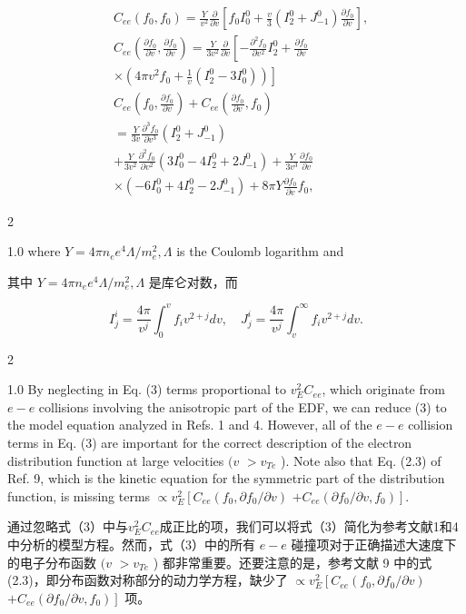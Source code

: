 \documentclass[oneside,onecolumn]{article}
\newcommand\enzhbox[2]{
  	\quad\par \begin{paracol}{2} \colseprulecolor{black} 
  			\begin{spacing}{1.0}
  				\footnotesize  #1
  			\end{spacing}
  		\switchcolumn[1] 
  		#2
  	\end{paracol} 
  }
\begin{document}
\begin{sloppypar}
  \begin{dmath}[compact]
  \begin{aligned}
  & C_{e e}\left(f_{0}, f_{0}\right)=\frac{Y}{v^{2}} \frac{\partial}{\partial v}\left[f_{0} I_{0}^{0}+\frac{v}{3}\left(I_{2}^{0}+J_{-1}^{0}\right) \frac{\partial f_{0}}{\partial v}\right], \\
  & C_{e e}\left(\frac{\partial f_{0}}{\partial v}, \frac{\partial f_{0}}{\partial v}\right)=\frac{Y}{3 v^{2}} \frac{\partial}{\partial v}\left[-\frac{\partial^{2} f_{0}}{\partial v^{2}} I_{2}^{0}+\frac{\partial f_{0}}{\partial v}\right. \\
  & \left.\times\left(4 \pi v^{2} f_{0}+\frac{1}{v}\left(I_{2}^{0}-3 I_{0}^{0}\right)\right)\right] \\
  & C_{e e}\left(f_{0}, \frac{\partial f_{0}}{\partial v}\right)+C_{e e}\left(\frac{\partial f_{0}}{\partial v}, f_{0}\right) \\
  & =\frac{Y}{3 v} \frac{\partial^{3} f_{0}}{\partial v^{3}}\left(I_{2}^{0}+J_{-1}^{0}\right) \\
  & +\frac{Y}{3 v^{2}} \frac{\partial^{2} f_{0}}{\partial v^{2}}\left(3 I_{0}^{0}-4 I_{2}^{0}+2 J_{-1}^{0}\right)+\frac{Y}{3 v^{3}} \frac{\partial f_{0}}{\partial v} \\
  & \times\left(-6 I_{0}^{0}+4 I_{2}^{0}-2 J_{-1}^{0}\right)+8 \pi Y \frac{\partial f_{0}}{\partial v} f_{0},
  \end{aligned}
  \end{dmath}
  
 
\enzhbox{   where $Y=4 \pi n_{e} e^{4} \Lambda / m_{e}^{2}, \Lambda$ is the Coulomb logarithm and
}{
其中 $Y=4 \pi n_{e} e^{4} \Lambda / m_{e}^{2}, \Lambda$ 是库仑对数，而

}
  
  \begin{dmath*}[compact]
  I_{j}^{i}=\frac{4 \pi}{v^{j}} \int_{0}^{v} f_{i} v^{2+j} d v, \quad J_{j}^{i}=\frac{4 \pi}{v^{j}} \int_{v}^{\infty} f_{i} v^{2+j} d v .
  \end{dmath*}
  
 
\enzhbox{   By neglecting in Eq. (3) terms proportional to $v_{E}^{2} C_{e e}$, which originate from $e-e$ collisions involving the anisotropic part of the EDF, we can reduce (3) to the model equation analyzed in Refs. 1 and 4. However, all of the $e-e$ collision terms in Eq. (3) are important for the correct description of the electron distribution function at large velocities $(v$ $>v_{T e}$ ). Note also that Eq. (2.3) of Ref. 9, which is the kinetic equation for the symmetric part of the distribution function, is missing terms $\propto v_{E}^{2}\left[C_{e e}\left(f_{0}, \partial f_{0} / \partial v\right)\right.$ $\left.+C_{e e}\left(\partial f_{0} / \partial v, f_{0}\right)\right]$.
}{
通过忽略式（3）中与$v_{E}^{2} C_{e e}$成正比的项，我们可以将式（3）简化为参考文献1和4中分析的模型方程。然而，式（3）中的所有 $e-e$ 碰撞项对于正确描述大速度下的电子分布函数 $(v$ $>v_{T e}$ ) 都非常重要。还要注意的是，参考文献 9 中的式(2.3)，即分布函数对称部分的动力学方程，缺少了 $\propto v_{E}^{2}\left[C_{e e}\left(f_{0}, \partial f_{0} / \partial v\right)\right.$ $\left.+C_{e e}\left(\partial f_{0} / \partial v, f_{0}\right)\right]$ 项。

}
\end{sloppypar}
\end{document}
